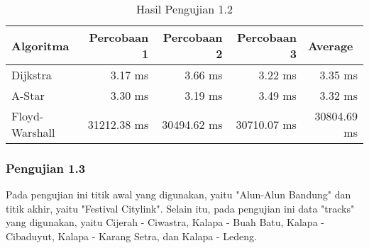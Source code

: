 \begin{table}[H]
\centering
\caption{Hasil Pengujian 1.2}
\label{tab:hasiluji1.2}
{\large
\begin{tabular}{|l|r|r|r|r|}
\hline
\textbf{Algoritma} & \textbf{Percobaan 1} & \textbf{Percobaan 2} & \textbf{Percobaan 3} & \multicolumn{1}{l|}{\textbf{Average}}\\ \hline
Dijkstra           & 3.17 ms              & 3.66 ms             & 3.22 ms       &       3.35 ms             \\ \hline
A-Star            & 3.30 ms              & 3.19 ms              & 3.49 ms       &       3.32 ms             \\ \hline
Floyd-Warshall     & 31212.38 ms              & 30494.62 ms               & 30710.07 ms     &   30804.69 ms            \\ \hline
\end{tabular}
}
\end{table}

\subsubsection{Pengujian 1.3}
Pada pengujian ini titik awal yang digunakan, yaitu "Alun-Alun Bandung" dan titik akhir, yaitu "Festival Citylink". Selain itu, pada pengujian ini data "tracks" yang digunakan, yaitu Cijerah - Ciwastra, Kalapa - Buah Batu, Kalapa - Cibaduyut, Kalapa - Karang Setra, dan Kalapa - Ledeng.

\begin{comment}
\begin{table}[H]
\centering
\caption{Data Pengujian 1.3}
\label{tab:data1.3}
{\large
\begin{tabular}{|l|l|}
\hline
\textbf{trackId}       & \textbf{trackName}             \\ \hline
cijerahciwastra & Cijerah - Ciwastra \\ \hline
kalapabuahbatu & Kalapa - Buah Batu \\ \hline
kalapacibaduyut   & Kalapa - Cibaduyut     \\ \hline
kalapakarangsetra        & Kalapa - Karang Setra             \\ \hline
kalapaledeng        & Kalapa - Ledeng             \\ \hline
\end{tabular}
}
\end{table}
\end{comment}

